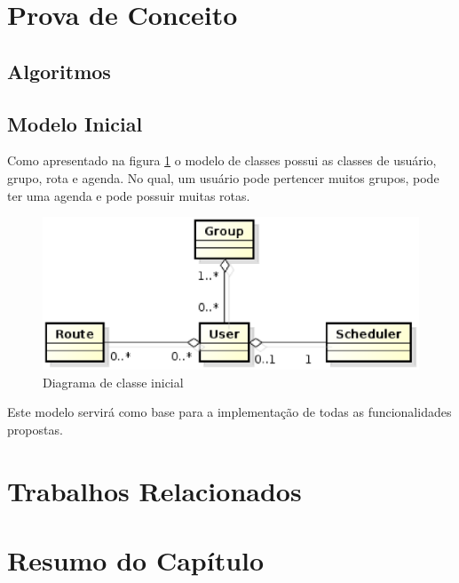 \section{Prova de Conceito}

\subsection{Algoritmos}

\subsection{Modelo Inicial}

Como apresentado na figura \ref{diagrama de classe} o modelo de classes possui as classes de usuário, grupo, rota e agenda. No qual, um usuário pode pertencer muitos grupos, pode ter uma agenda e pode possuir muitas rotas.

\begin{figure}[!h]
	\centering
	\includegraphics[scale=0.55]{figuras/capitulo5/diagrama_classe.eps}
	\caption{Diagrama de classe inicial}
	\label{diagrama de classe}
\end{figure}

Este modelo servirá como base para a implementação de todas as funcionalidades propostas.

\section{Trabalhos Relacionados}

\section{Resumo do Capítulo}
